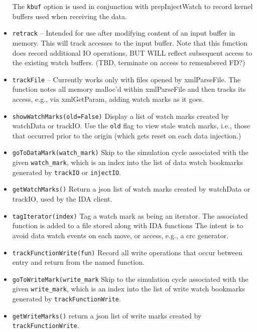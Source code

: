 \documentclass[titlepage]{article}
\begin{document}
\begin{itemize}
The {\tt kbuf} option is used in conjunction with prepInjectWatch to record kernel buffers used when receiving the data.

\item {\tt retrack} -- Intended for use after modifying content of an input buffer in memory.  This will track accesses to the input buffer.
Note that this function does record additional IO operations, BUT WILL reflect subsequent access to the existing watch buffers.  (TBD, terminate on access
to remembered FD?)

\item {\tt trackFile} -- Currently works only with files opened by xmlParseFile. The function notes all memory malloc'd within
xmlParseFile and then tracks its access, e.g., via xmlGetParam, adding watch marks as it goes.

\item {\tt showWatchMarks(old=False)} Display a list of watch marks created by watchData or trackIO.  Use the {\tt old} flag to view stale watch marks, i.e., 
those that occurred prior to the origin (which gets reset on each data injection.)

\item {\tt goToDataMark(watch\_mark)}  Skip to the simulation cycle associated with the given {\tt watch\_mark}, which is an index into the list of data watch bookmarks generated by {\tt trackIO} or {\tt injectIO}.

\item {\tt getWatchMarks()} Return a json list of watch marks created by watchData or trackIO, used by the IDA client.

\item {\tt tagIterator(index)} Tag a watch mark as being an iterator.  The associated function is added to a file stored along with IDA functions
The intent is to avoid data watch events on each move, or access, e.g., a crc generator.

\item {\tt trackFunctionWrite(fun)} Record all write operations that occur between entry and return from the named function.

\item {\tt goToWriteMark(write\_mark} Skip to the simulation cycle associated with the given {\tt write\_mark}, which is an index into the list of 
write watch bookmarks generated by {\tt trackFunctionWrite}.

\item {\tt getWriteMarks()} return a json list of write marks created by {\tt trackFunctionWrite}.


\end{itemize}
\end{document}
